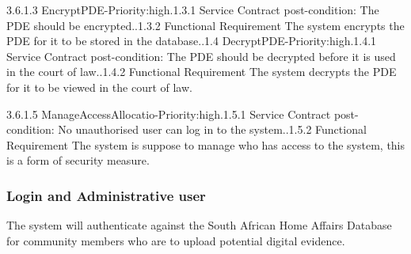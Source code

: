 \documentclass[a4paper,12pt]{article}
\begin{document}
3.6.1.3 EncryptPDE-Priority:high.1.3.1 Service Contract\newline
		post-condition: The PDE should be encrypted..1.3.2 Functional Requirement\newline
	The system encrypts the PDE for it to be stored in the database..1.4 DecryptPDE-Priority:high.1.4.1 Service Contract\newline
	post-condition: The PDE should be decrypted before it is used in the court of law..1.4.2 Functional Requirement\newline
	The system decrypts the PDE for it to be viewed in the court of law.\newline
	
3.6.1.5 ManageAccessAllocatio-Priority:high.1.5.1 Service Contract\newline
	post-condition: No unauthorised user can log in to the system..1.5.2 Functional Requirement\newline
	The system is suppose to manage who has access to the system, this is a form of security measure.\newline

\subsubsection {Login and Administrative user}

The system will authenticate against the South African Home Affairs Database for community members who are to upload potential digital evidence.\newline
\end{document}
